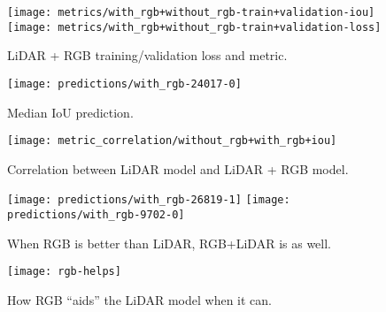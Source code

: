 \begin{figure}[H]
  \centering
  \texttt{[image: metrics/with\_rgb+without\_rgb-train+validation-iou]}
  \texttt{[image: metrics/with\_rgb+without\_rgb-train+validation-loss]}
  \caption{%
    LiDAR + RGB training/validation loss and metric.
  }
\end{figure}

\begin{figure}[H]
  \centering
  \texttt{[image: predictions/with\_rgb-24017-0]}  %
  \caption{%
    Median IoU prediction.
  }
\end{figure}

\begin{figure}[H]
  \centering
  \texttt{[image: metric\_correlation/without\_rgb+with\_rgb+iou]}
  \caption{%
    Correlation between LiDAR model and LiDAR + RGB model.
  }
\end{figure}

\begin{figure}[H]
  \centering
  \texttt{[image: predictions/with\_rgb-26819-1]}  %
  \textcolor{gray}{\vrule}
  \texttt{[image: predictions/with\_rgb-9702-0]}  %
  \caption{%
    When RGB is better than LiDAR, RGB+LiDAR is as well.
  }
\end{figure}

\begin{figure}[H]
  \centering
  \texttt{[image: rgb-helps]}
  \caption{%
    How RGB \enquote{aids} the LiDAR model when it can.
  }
  \label{fig:rgb-help}
\end{figure}
